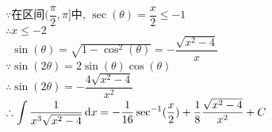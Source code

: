 $\because$在区间$(\dfrac{\pi}{2},\pi]$中, $\sec(\theta)=\dfrac{x}{2}\leqslant -1$\\[1ex]
$\therefore x\leqslant -2$\\
$\phantom{\therefore}\sin(\theta)=\sqrt{1-\cos^2(\theta)}=-\dfrac{\sqrt{x^2-4}}{x}$\\
$\because\sin(2\theta)=2\sin(\theta)\cos(\theta)$\\
$\therefore\sin(2\theta)=-\dfrac{4\sqrt{x^2-4}}{x^2}$\\
$\displaystyle\therefore\int\frac{1}{x^3\sqrt{x^2-4}}\mathop{}\!\mathrm{d} x=-\frac{1}{16}\sec^{-1}(\frac{x}{2})+\frac{1}{8}\frac{\sqrt{x^2-4}}{x^2}+C$
